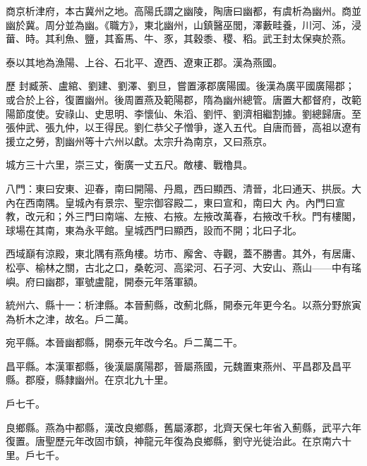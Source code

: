 
\begin{pinyinscope}

 商京析津府，本古冀州之地。高陽氏謂之幽陵，陶唐曰幽都，有虞析為幽州。商並幽於冀。周分並為幽。《職方》，東北幽州，山鎮醫巫閭，澤藪畦養，川河、泲，浸葘、時。其利魚、鹽，其畜馬、牛、豕，其穀黍、稷、稻。武王封太保奭於燕。



 泰以其地為漁陽、上谷、石北平、遼西、遼東正郡。漢為燕國。



 歷
 封臧荼、盧綰、劉建、劉澤、劉旦，嘗置涿郡廣陽國。後漢為廣平國廣陽郡；或合於上谷，復置幽州。後周置燕及範陽郡，隋為幽州總管。唐置大都督府，改範陽節度使。安祿山、史思明、李懷仙、朱滔、劉怦、劉濟相繼割據。劉總歸唐。至張仲武、張九仲，以王得民。劉仁恭父子憎爭，遂入五代。自唐而晉，高祖以遼有援立之勞，割幽州等十六州以獻。太宗升為南京，又曰燕京。



 城方三十六里，崇三丈，衡廣一丈五尺。敵樓、戰櫓具。



 八門：東曰安東、迎春，南曰開陽、丹鳳，西曰顯西、清晉，北曰通天、拱辰。大內在西南隅。皇城內有景宗、聖宗御容殿二，東曰宣和，南曰大
 內。內門曰宣教，改元和；外三門曰南端、左掖、右掖。左掖改萬春，右掖改千秋。門有樓閣，球場在其南，東為永平館。皇城西門曰顯西，設而不開；北曰子北。



 西域巔有涼殿，東北隅有燕角樓。坊市、廨舍、寺觀，蓋不勝書。其外，有居庸、松亭、榆林之關，古北之口，桑乾河、高梁河、石子河、大安山、燕山——中有瑤嶼。府曰幽郡，軍號盧龍，開泰元年落軍額。



 統州六、縣十一：析津縣。本晉薊縣，改薊北縣，開泰元年更今名。以燕分野旅寅為析木之津，故名。戶二萬。



 宛平縣。本晉幽都縣，開泰元年改今名。戶二萬二干。



 昌平縣。本漢軍都縣，後漢屬廣陽郡，晉屬燕國，元魏置東燕州、平昌郡及昌平縣。郡廢，縣隸幽州。在京北九十里。



 戶七千。



 良鄉縣。燕為中都縣，漢改良鄉縣，舊屬涿郡，北齊天保七年省入薊縣，武平六年復置。唐聖歷元年改固市鎮，神龍元年復為良鄉縣，劉守光徙治此。在京南六十里。戶七千。




\end{pinyinscope}
